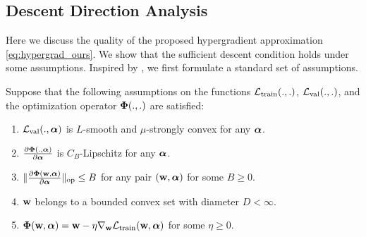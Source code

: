 \subsection{Descent Direction Analysis}
Here we discuss the quality of the proposed hypergradient approximation \eqref{eq:hypergrad_ours}. We show that the sufficient descent condition holds under some assumptions. Inspired by \cite{shaban2019truncated, ghadimi2018approximation}, we first formulate a standard set of assumptions.
\begin{assumption}\label{asn:std}
     Suppose that the following assumptions on the functions $\mathcal{L}_{\mathrm{train}}(., .)$, $\mathcal{L}_{\mathrm{val}}(., .)$, and the optimization operator $\boldsymbol{\mathbf{\Phi}}(., .)$ are satisfied:
     \begin{enumerate}
         \item $\mathcal{L}_{\mathrm{val}}(., \boldsymbol{\mathbf{\alpha}})$ is $L$-smooth and $\mu$-strongly convex for any $\boldsymbol{\mathbf{\alpha}}$.
        \item $\frac{\partial\boldsymbol{\mathbf{\Phi}}(., \boldsymbol{\mathbf{\alpha}})}{\partial\boldsymbol{\mathbf{\alpha}}}$ is $C_B$-Lipschitz for any $\boldsymbol{\mathbf{\alpha}}$.
        \item $\|\frac{\partial\boldsymbol{\mathbf{\Phi}}(\boldsymbol{\mathbf{w}}, \boldsymbol{\mathbf{\alpha}})}{\partial\boldsymbol{\mathbf{\alpha}}}\|_\text{op} \leq B$ for any pair $(\boldsymbol{\mathbf{w}}, \boldsymbol{\mathbf{\alpha}})$ for some $B \geq 0$.
        \item $\boldsymbol{\mathbf{w}}$ belongs to a bounded convex set with diameter $D < \infty$.
        \item $\boldsymbol{\mathbf{\Phi}}(\boldsymbol{\mathbf{w}}, \boldsymbol{\mathbf{\alpha}}) = \boldsymbol{\mathbf{w}} - \eta\nabla_{\boldsymbol{\mathbf{w}}}\mathcal{L}_{\mathrm{train}}(\boldsymbol{\mathbf{w}}, \boldsymbol{\mathbf{\alpha}})$ for some $\eta \geq 0$.
     \end{enumerate}
\end{assumption}


